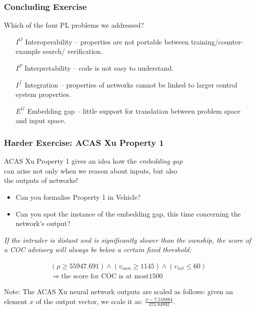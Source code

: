 \documentclass[aspectratio=169]{beamer}
\begin{document}
\begin{frame}
\frametitle{Concluding Exercise}

Which of the four PL problems we addressed?

\begin{itemize}
\item[$I^O$] Interoperability -- properties are not portable between training/counter-example search/ verification.

\item[$I^{P}$] Interpretability -- code is not easy to understand.

\item[$I^{\int}$] Integration -- properties of networks cannot be linked to larger control system properties.

\item[$E^G$] Embedding gap -- little support for translation between problem space  and input space.
\end{itemize}
\end{frame}



\begin{frame}
\frametitle{Harder Exercise: ACAS Xu Property 1}

\small{
ACAS Xu Property 1 gives an idea how the {\it embedding gap}\\
 can arise not only when we reason about inputs, but also \\ the outputs of networks!

\begin{itemize}
\item Can you formalise Property 1 in Vehicle?
\item Can you spot the instance of the embedding gap, this time concerning the network's output?
\end{itemize}}

\pause

\begin{definition}
\small{\it If the intruder is distant and is significantly slower than the ownship, the score of a COC advisory will always be below a certain fixed threshold:}



\begin{equation*}
\begin{array}{l}
(\rho \geq 55947.691) \wedge
(v_{own} \geq 1145) \wedge (v_{int} \leq 60)  \\
\Rightarrow \text{the score for COC is at most} 1500
\end{array}
\end{equation*}
\end{definition}

\pause

\begin{block}{Note:}
The ACAS Xu neural network outputs are scaled as follows: given an element $x$ of the output vector, we scale it as: $\frac{x - 7.518884}{373.94992}$. 
\end{block}

\end{frame}
\end{document}
